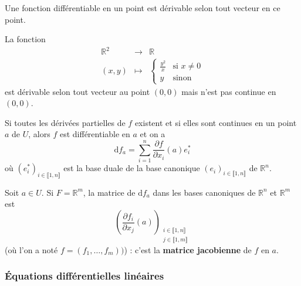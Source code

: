   \begin{proposition}
    Une fonction différentiable en un point est dérivable selon tout vecteur en ce point.
  \end{proposition}

  \begin{cexample}
    La fonction
    \[
      \begin{array}{ccc}
        \mathbb{R}^2 &\rightarrow& \mathbb{R} \\
        (x,y) &\mapsto& \begin{cases}
          \frac{y^2}{x} &\text{si } x \neq 0 \\
          y &\text{sinon}
        \end{cases}
      \end{array}
    \]
    est dérivable selon tout vecteur au point $(0,0)$ mais n'est pas continue en $(0,0)$.
  \end{cexample}

  \begin{theorem}
    Si toutes les dérivées partielles de $f$ existent et si elles sont continues en un point $a$ de $U$, alors $f$ est différentiable en $a$ et on a
    \[ \mathrm{d}f_a = \sum_{i=1}^n \frac{\partial f}{\partial x_i}(a) e_i^* \]
    où $(e_i^*)_{i \in \llbracket 1, n \rrbracket}$ est la base duale de la base canonique $(e_i)_{i \in \llbracket 1, n \rrbracket}$ de $\mathbb{R}^n$.
  \end{theorem}

  \begin{application}
    Soit $a \in U$. Si $F = \mathbb{R}^m$, la matrice de $\mathrm{d}f_a$ dans les bases canoniques de $\mathbb{R}^n$ et $\mathbb{R}^m$ est
    \[ \left(\frac{\partial f_i}{\partial x_j}(a)\right)_{\substack{i \in \llbracket 1, n \rrbracket \\ j \in \llbracket 1, m \rrbracket}} \]
    (où l'on a noté $f = (f_1, \dots, f_m))$) : c'est la \textbf{matrice jacobienne} de $f$ en $a$.
  \end{application}

  \subsubsection{Équations différentielles linéaires}


